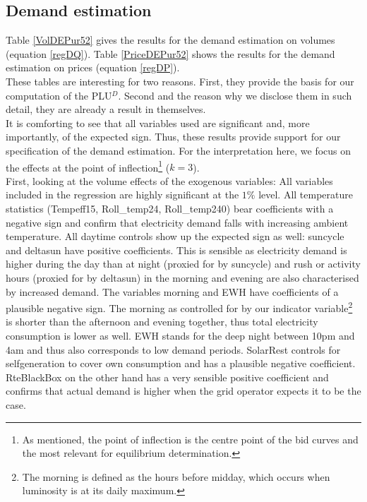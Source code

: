 \subsection{Demand estimation}
Table \ref{VolDEPur52} gives the results for the demand estimation on volumes (equation \ref{regDQ}). Table \ref{PriceDEPur52} shows the results for the demand estimation on prices (equation \ref{regDP}). \\

These tables are interesting for two reasons. First, they provide the basis for our computation of the PLU$^D$. Second and the reason why we disclose them in such detail, they are already a result in themselves. \\

It is comforting to see that all variables used are significant and, more importantly, of the expected sign. Thus, these results provide  support for our specification of the demand estimation. 
For the interpretation here, we focus on the effects at the point of inflection\footnote{As mentioned, the point of inflection is the centre point of the bid curves and the most relevant for equilibrium determination. %
} ($k=3$). \\

First, looking at the volume effects of the exogenous variables: 
All variables included in the regression are highly significant at the $1\%$ level.
All temperature statistics (Tempeff15, Roll\_temp24, Roll\_temp240) bear coefficients with a negative sign and confirm that electricity demand falls with increasing ambient temperature.  All daytime controls show up the expected sign as well: suncycle and deltasun have positive coefficients. This is sensible as electricity demand is higher during the day than at night (proxied for by suncycle) and rush or activity hours (proxied for by deltasun) in the morning and evening are also characterised by increased demand. The variables morning and EWH have coefficients of a plausible negative sign. The morning as controlled for by our indicator variable\footnote{The morning is defined as the hours before midday, which occurs when luminosity is at its daily maximum.} is shorter than the afternoon and evening together, thus total electricity consumption is lower as well. EWH stands for the deep night between 10pm and 4am and thus also corresponds to low demand periods. SolarRest controls for selfgeneration to cover own consumption and has a plausible negative coefficient. RteBlackBox on the other hand has a very sensible positive coefficient and confirms that actual demand is higher when the grid operator expects it to be the case. \\

